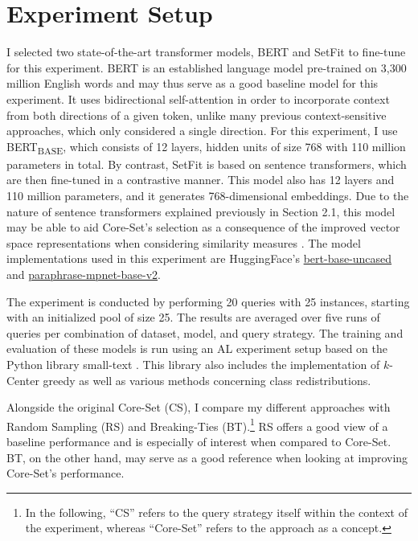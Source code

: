 \documentclass[english,bachelor,ul]{webisthesis} %
\begin{document}
\newpage 

\section{Experiment Setup}

I selected two state-of-the-art transformer models, BERT \citep{DBLP:conf/naacl/DevlinCLT19} and SetFit \citep{DBLP:setfit} to fine-tune for this experiment. BERT is an established language model pre-trained on 3,300 million English words and may thus serve as a good baseline model for this experiment. It uses bidirectional self-attention in order to incorporate context from both directions of a given token, unlike many previous context-sensitive approaches, which only considered a single direction. For this experiment, I use BERT\textsubscript{BASE}, which consists of 12 layers, hidden units of size 768 with 110 million parameters in total. By contrast, SetFit is based on sentence transformers, which are then fine-tuned in a contrastive manner. This model also has 12 layers and 110 million parameters, and it generates 768-dimensional embeddings. Due to the nature of sentence transformers explained previously in Section 2.1, this model may be able to aid Core-Set's selection as a consequence of the improved vector space representations when considering similarity measures \citep{DBLP:conf/emnlp/ReimersG19}. The model implementations used in this experiment are HuggingFace's \href{https://huggingface.co/google-bert/bert-base-uncased}{bert-base-uncased} and \href{https://huggingface.co/sentence-transformers/paraphrase-mpnet-base-v2}{
paraphrase-mpnet-base-v2}.

The experiment is conducted by performing 20 queries with 25 instances, starting with an initialized pool of size 25. The results are averaged over five runs of queries per combination of dataset, model, and query strategy. The training and evaluation of these models is run using an AL experiment setup based on the Python library small-text \citep{schroeder2023small-text}. This library also includes the implementation of $k$-Center greedy as well as various methods concerning class redistributions.

Alongside the original Core-Set (CS), I compare my different approaches with Random Sampling (RS) and Breaking-Ties (BT).\footnote{In the following, ``CS'' refers to the query strategy itself within the context of the experiment, whereas ``Core-Set'' refers to the approach as a concept.} RS offers a good view of a baseline performance and is especially of interest when compared to Core-Set. BT, on the other hand, may serve as a good reference when looking at improving Core-Set's performance.
\end{document}
